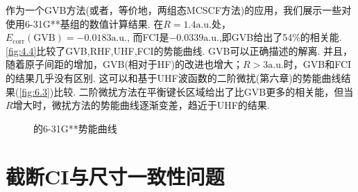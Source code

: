 

作为一个GVB方法(或者，等价地，两组态MCSCF方法)的应用，我们展示一些对使用6-31G**基组的数值计算结果.
在$R=1.4\text{a.u.}$处，
$E_{\text{corr}}(\text{GVB})= -0.0183\text{a.u.}$,
而FCI是$ -0.0339\text{a.u.}$,即GVB给出了54\%的相关能.
\autoref{fig:4.4}比较了GVB,RHF,UHF,FCI的势能曲线.
GVB可以正确描述的解离.
并且，随着原子间距的增加，GVB(相对于HF)的改进也增大；$R>3\text{a.u.}$时，GVB和FCI的结果几乎没有区别.
这可以和基于UHF波函数的二阶微扰(第六章)的势能曲线结果(\autoref{fig:6.3})比较.
二阶微扰方法在平衡键长区域给出了比GVB更多的相关能，但当$R$增大时，微扰方法的势能曲线逐渐变差，趋近于UHF的结果.

\begin{figure}[H]
	\caption{的6-31G**势能曲线}
\label{fig:4.4}
\end{figure}

\section{截断CI与尺寸一致性问题}
\label{sec4.6}




\theendnotes
